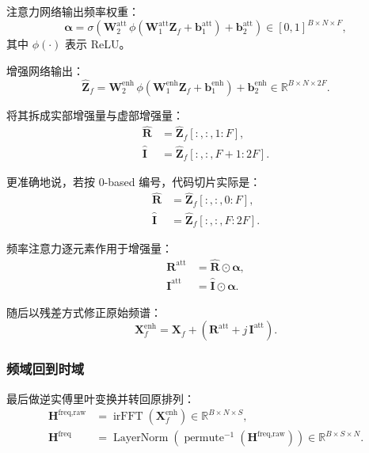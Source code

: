 \documentclass[UTF8]{ctexart}
\begin{document}
注意力网络输出频率权重：
\begin{equation}
    \bm{\alpha}
    =
    \sigma\!\left(
        \bm{W}^{\text{att}}_2
        \,\phi\!\left(
            \bm{W}^{\text{att}}_1 \bm{Z}_f + \bm{b}^{\text{att}}_1
        \right)
        + \bm{b}^{\text{att}}_2
    \right)
    \in [0,1]^{B \times N \times F},
\end{equation}
其中 $\phi(\cdot)$ 表示 ReLU。

增强网络输出：
\begin{equation}
    \hat{\bm{Z}}_f
    =
    \bm{W}^{\text{enh}}_2
    \,\phi\!\left(
        \bm{W}^{\text{enh}}_1 \bm{Z}_f + \bm{b}^{\text{enh}}_1
    \right)
    + \bm{b}^{\text{enh}}_2
    \in \mathbb{R}^{B \times N \times 2F}.
\end{equation}

将其拆成实部增强量与虚部增强量：
\begin{align}
    \hat{\bm{R}} &= \hat{\bm{Z}}_f[:, :, 1:F], \\
    \hat{\bm{I}} &= \hat{\bm{Z}}_f[:, :, F+1:2F].
\end{align}

更准确地说，若按 0-based 编号，代码切片实际是：
\begin{align}
    \hat{\bm{R}} &= \hat{\bm{Z}}_f[:, :, 0:F], \\
    \hat{\bm{I}} &= \hat{\bm{Z}}_f[:, :, F:2F].
\end{align}

频率注意力逐元素作用于增强量：
\begin{align}
    \bm{R}^{\text{att}} &= \hat{\bm{R}} \odot \bm{\alpha}, \\
    \bm{I}^{\text{att}} &= \hat{\bm{I}} \odot \bm{\alpha}.
\end{align}

随后以残差方式修正原始频谱：
\begin{equation}
    \bm{X}^{\text{enh}}_f = \bm{X}_f + \left(\bm{R}^{\text{att}} + j\,\bm{I}^{\text{att}}\right).
\end{equation}

\subsubsection{频域回到时域}

最后做逆实傅里叶变换并转回原排列：
\begin{align}
    \bm{H}^{\text{freq,raw}} &= \operatorname{irFFT}(\bm{X}^{\text{enh}}_f) \in \mathbb{R}^{B \times N \times S}, \\
    \bm{H}^{\text{freq}} &= \operatorname{LayerNorm}(\operatorname{permute}^{-1}(\bm{H}^{\text{freq,raw}})) \in \mathbb{R}^{B \times S \times N}.
\end{align}
\end{document}
